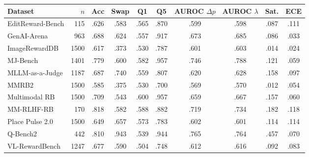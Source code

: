 \begin{tabular}{lrcccccccc}
\toprule
Dataset & $n$ & Acc & Swap & Q1 & Q5 & AUROC $\Delta p$ & AUROC $\lambda$ & Sat. & ECE\\
\midrule
EditReward-Bench & 115 & .626 & .583 & .565 & .870 & .599 & .598 & .087 & .111\\
GenAI-Arena & 963 & .688 & .624 & .557 & .917 & .673 & .685 & .086 & .033\\
ImageRewardDB & 1500 & .617 & .373 & .530 & .787 & .601 & .603 & .014 & .024\\
MJ-Bench & 1401 & .779 & .600 & .582 & .957 & .746 & .788 & .121 & .059\\
MLLM-as-a-Judge & 1187 & .687 & .740 & .559 & .807 & .620 & .628 & .158 & .097\\
MMRB2 & 1500 & .585 & .375 & .530 & .700 & .569 & .570 & .012 & .054\\
Multimodal RB & 1500 & .709 & .543 & .600 & .957 & .659 & .667 & .157 & .060\\
MM-RLHF-RB & 170 & .818 & .582 & .588 & .882 & .719 & .734 & .182 & .118\\
Place Pulse 2.0 & 1500 & .649 & .657 & .573 & .783 & .602 & .601 & .114 & .114\\
Q-Bench2 & 442 & .810 & .943 & .539 & .944 & .765 & .764 & .457 & .070\\
VL-RewardBench & 1247 & .677 & .590 & .504 & .748 & .612 & .616 & .092 & .083\\
\bottomrule
\end{tabular}
